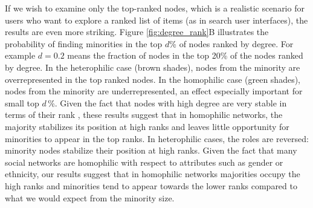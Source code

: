 If we wish to examine only the top-ranked nodes, which is a realistic scenario for users who want to explore a ranked list of items (as in search user interfaces), the results are even more striking. Figure \ref{fig:degree_rank}B illustrates the probability of finding minorities in the top $d$\% of nodes ranked by degree. For example $d = 0.2$ means the fraction of nodes in the top 20\% of the nodes ranked by degree. 
In the heterophilic case (brown shades), nodes from the minority are overrepresented in the top ranked nodes. In the homophilic case (green shades), nodes from the minority are underrepresented, an effect especially important for small top $d$\,\%. Given the fact that nodes with high degree are very stable in terms of their rank \cite{ghoshal2011ranking}, these results suggest that in homophilic networks, the majority stabilizes its position at high ranks and leaves little opportunity for minorities to appear in the top ranks. In heterophilic cases, the roles are reversed: minority nodes stabilize their position at high ranks.    Given the fact that many social networks are homophilic with respect to attributes such as gender or ethnicity, our results suggest that in homophilic networks majorities occupy the high ranks and minorities tend to appear towards the lower ranks compared to what we would expect from the minority size.









